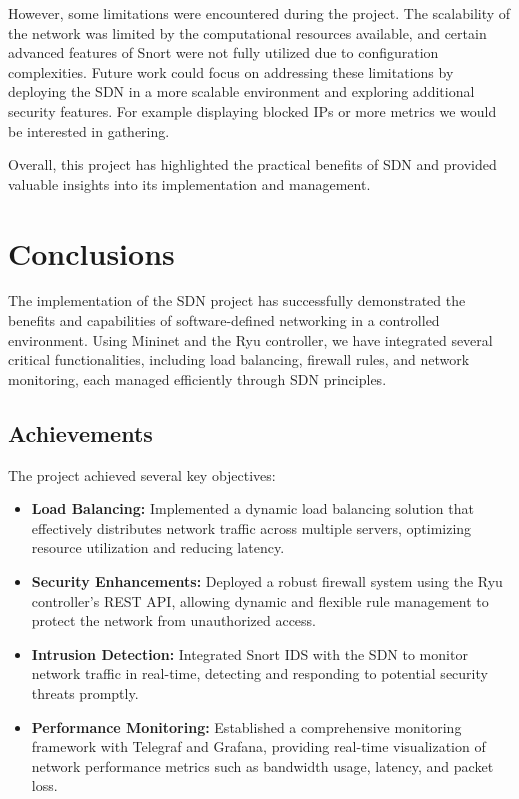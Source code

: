 \documentclass[a4paper,12pt]{article}
\begin{document}
However, some limitations were encountered during the project. The scalability of the network was limited by the computational resources available, and certain advanced features of Snort were not fully utilized due to configuration complexities. Future work could focus on addressing these limitations by deploying the SDN in a more scalable environment and exploring additional security features. For example displaying blocked IPs or more metrics we would be interested in gathering.

Overall, this project has highlighted the practical benefits of SDN and provided valuable insights into its implementation and management.

\section{Conclusions}

The implementation of the SDN project has successfully demonstrated the benefits and capabilities of software-defined networking in a controlled environment. Using Mininet and the Ryu controller, we have integrated several critical functionalities, including load balancing, firewall rules, and network monitoring, each managed efficiently through SDN principles.

\subsection{Achievements}

The project achieved several key objectives:
\begin{itemize}
    \item \textbf{Load Balancing:} Implemented a dynamic load balancing solution that effectively distributes network traffic across multiple servers, optimizing resource utilization and reducing latency.
    \item \textbf{Security Enhancements:} Deployed a robust firewall system using the Ryu controller's REST API, allowing dynamic and flexible rule management to protect the network from unauthorized access.
    \item \textbf{Intrusion Detection:} Integrated Snort IDS with the SDN to monitor network traffic in real-time, detecting and responding to potential security threats promptly.
    \item \textbf{Performance Monitoring:} Established a comprehensive monitoring framework with Telegraf and Grafana, providing real-time visualization of network performance metrics such as bandwidth usage, latency, and packet loss.
\end{itemize}
\end{document}
